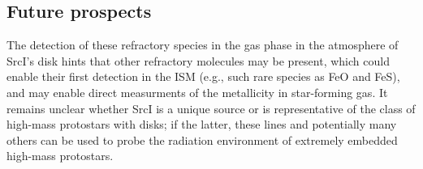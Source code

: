 \documentclass[twocolumn]{aastex62}
\newcommand{\sourcei}{SrcI\xspace}
\newcommand{\bam}[1]{\textcolor{green!65!black}{\textbf{[BAM: #1]}}}
\newcommand{\ag}[1]{\textcolor{red!65!black}{\textbf{[AG: #1]}}}
\begin{document}

%

\subsection{Future prospects}
The detection of these refractory species in the gas phase in the atmosphere
of \sourcei's disk hints that other refractory molecules may be present, 
which could enable their first detection in the ISM (e.g., such rare species as
FeO and FeS), and may enable direct measurments of the metallicity in
star-forming gas.
It remains unclear whether \sourcei is a unique source or is representative
of the class of high-mass protostars with disks; if the latter, these lines
and potentially many others can be used to probe the radiation environment of 
extremely embedded high-mass protostars.
\end{document}
